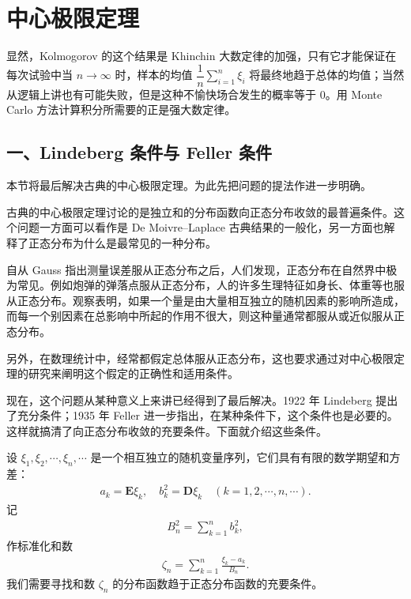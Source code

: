 \documentclass[../../main.tex]{subfiles}
\begin{document}
\section{中心极限定理}\label{section:ch05-中心极限定理}

显然，Kolmogorov 的这个结果是 Khinchin 大数定律的加强，只有它才能保证在每次试验中当 $n\to\infty$ 时，样本的均值 $\dfrac1n\sum_{i=1}^{n}\xi_i$ 将最终地趋于总体的均值；当然从逻辑上讲也有可能失败，但是这种不愉快场合发生的概率等于 $0$。用 Monte Carlo 方法计算积分所需要的正是强大数定律。

\subsection*{一、Lindeberg 条件与 Feller 条件}

本节将最后解决古典的中心极限定理。为此先把问题的提法作进一步明确。

古典的中心极限定理讨论的是独立和的分布函数向正态分布收敛的最普遍条件。这个问题一方面可以看作是 De Moivre--Laplace 古典结果的一般化，另一方面也解释了正态分布为什么是最常见的一种分布。

自从 Gauss 指出测量误差服从正态分布之后，人们发现，正态分布在自然界中极为常见。例如炮弹的弹落点服从正态分布，人的许多生理特征如身长、体重等也服从正态分布。观察表明，如果一个量是由大量相互独立的随机因素的影响所造成，而每一个别因素在总影响中所起的作用不很大，则这种量通常都服从或近似服从正态分布。

另外，在数理统计中，经常都假定总体服从正态分布，这也要求通过对中心极限定理的研究来阐明这个假定的正确性和适用条件。

现在，这个问题从某种意义上来讲已经得到了最后解决。1922 年 Lindeberg 提出了充分条件；1935 年 Feller 进一步指出，在某种条件下，这个条件也是必要的。这样就搞清了向正态分布收敛的充要条件。下面就介绍这些条件。

设 $\xi_1,\xi_2,\cdots,\xi_n,\cdots$ 是一个相互独立的随机变量序列，它们具有有限的数学期望和方差：
\begin{align*}
a_k=\boldsymbol{E}\xi_k,\quad b_k^{2}=\boldsymbol{D}\xi_k\quad(k=1,2,\cdots,n,\cdots).
\end{align*}
记
\begin{align*}
B_n^{2}=\sum_{k=1}^{n}b_k^{2},
\end{align*}
作标准化和数
\begin{align}
\zeta_n=\sum_{k=1}^{n}\frac{\xi_k-a_k}{B_n}.
\end{align}
我们需要寻找和数 $\zeta_n$ 的分布函数趋于正态分布函数的充要条件。
\end{document}
